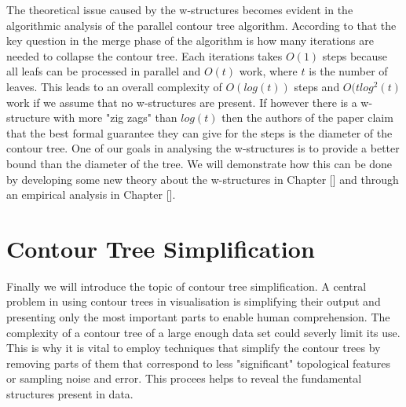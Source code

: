 
The theoretical issue caused by the w-structures becomes evident in the algorithmic analysis of the parallel contour tree algorithm. According to that the key question in the merge phase of the algorithm is how many iterations are needed to collapse the contour tree. Each iterations takes $O(1)$ steps because all leafs can be processed in parallel and $O(t)$ work, where $t$ is the number of leaves. This leads to an overall complexity of $O(log(t))$ steps and $O(tlog^2(t)$ work if we assume that no w-structures are present. If however there is a w-structure with more "zig zags" than $log(t)$ then the authors of the paper claim that the best formal guarantee they can give for the steps is the diameter of the contour tree. One of our goals in analysing the w-structures is to provide a better bound than the diameter of the tree. We will demonstrate how this can be done by developing some new theory about the w-structures in Chapter [] and through an empirical analysis in Chapter [].


\section{Contour Tree Simplification}

Finally we will introduce the topic of contour tree simplification. A central problem in using contour trees in visualisation is simplifying their output and presenting only the most important parts to enable human comprehension. The complexity of a contour tree of a large enough data set could severly limit its use. This is why it is vital to employ techniques that simplify the contour trees by removing parts of them that correspond to less "significant" topological features or sampling noise and error. This procees helps to reveal the fundamental structures present in data.



